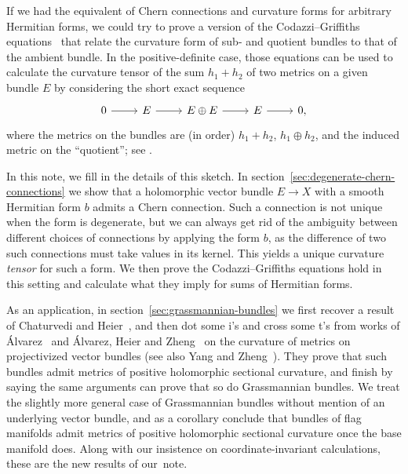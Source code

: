 \documentclass[10pt,a4paper]{amsart}
\theoremstyle{definition}
\begin{document}
If we had the equivalent of Chern connections and curvature forms for arbitrary Hermitian forms, we could try to prove a version of the Codazzi--Griffiths equations~\cite{griffiths1965hermitian} that relate the curvature form of sub- and quotient bundles to that of the ambient bundle. In the positive-definite case, those equations can be used to calculate the curvature tensor of the sum $h_1 + h_2$ of two metrics on a given bundle $E$ by considering the short exact sequence
\[
\begin{tikzcd}
0 \ar[r] & E \ar[r] & E\oplus E \ar[r] &  E \ar[r] & 0,
\end{tikzcd}
\]
where the metrics on the bundles are (in order) $h_1 + h_2$, $h_1 \oplus h_2$, and the induced metric on the ``quotient''; see \cite[Chapter~7, Exercise~6]{zheng2000complex}.

In this note, we fill in the details of this sketch. In section~\ref{sec:degenerate-chern-connections} we show that a holomorphic vector bundle $E \to X$ with a smooth Hermitian form $b$ admits a Chern connection. Such a connection is not unique when the form is degenerate, but we can always get rid of the ambiguity between different choices of connections by applying the form $b$, as the difference of two such connections must take values in its kernel. This yields a unique curvature \emph{tensor} for such a form. We then prove the Codazzi--Griffiths equations hold in this setting and calculate what they imply for sums of Hermitian forms.

As an application, in section~\ref{sec:grassmannian-bundles} we first recover a result of Chaturvedi and Heier~\cite{chaturvedi2020hermitian}, and then dot some i's and cross some t's from works of \'Alvarez~\cite{alvarez2016positive} and \'Alvarez, Heier and Zheng~\cite{alvarez2018projectivized} on the curvature of metrics on projectivized vector bundles (see also Yang and Zheng~\cite{yang2019hirzebruch}). They prove that such bundles admit metrics of positive holomorphic sectional curvature, and finish by saying the same arguments can prove that so do Grassmannian bundles. We treat the slightly more general case of Grassmannian bundles without mention of an underlying vector bundle, and as a corollary conclude that bundles of flag manifolds admit metrics of positive holomorphic sectional curvature once the base manifold does.
Along with our insistence on coordinate-invariant calculations, these are the new results of our~note.%

\end{document}
